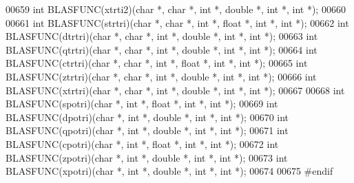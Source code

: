 \begin{DoxyCode}
00659 \textcolor{keywordtype}{int} BLASFUNC(xtrti2)(\textcolor{keywordtype}{char} *, \textcolor{keywordtype}{char} *, \textcolor{keywordtype}{int} *, \textcolor{keywordtype}{double} *, \textcolor{keywordtype}{int} *, \textcolor{keywordtype}{int} *);
00660 
00661 \textcolor{keywordtype}{int} BLASFUNC(strtri)(\textcolor{keywordtype}{char} *, \textcolor{keywordtype}{char} *, \textcolor{keywordtype}{int} *, \textcolor{keywordtype}{float}  *, \textcolor{keywordtype}{int} *, \textcolor{keywordtype}{int} *);
00662 \textcolor{keywordtype}{int} BLASFUNC(dtrtri)(\textcolor{keywordtype}{char} *, \textcolor{keywordtype}{char} *, \textcolor{keywordtype}{int} *, \textcolor{keywordtype}{double} *, \textcolor{keywordtype}{int} *, \textcolor{keywordtype}{int} *);
00663 \textcolor{keywordtype}{int} BLASFUNC(qtrtri)(\textcolor{keywordtype}{char} *, \textcolor{keywordtype}{char} *, \textcolor{keywordtype}{int} *, \textcolor{keywordtype}{double} *, \textcolor{keywordtype}{int} *, \textcolor{keywordtype}{int} *);
00664 \textcolor{keywordtype}{int} BLASFUNC(ctrtri)(\textcolor{keywordtype}{char} *, \textcolor{keywordtype}{char} *, \textcolor{keywordtype}{int} *, \textcolor{keywordtype}{float}  *, \textcolor{keywordtype}{int} *, \textcolor{keywordtype}{int} *);
00665 \textcolor{keywordtype}{int} BLASFUNC(ztrtri)(\textcolor{keywordtype}{char} *, \textcolor{keywordtype}{char} *, \textcolor{keywordtype}{int} *, \textcolor{keywordtype}{double} *, \textcolor{keywordtype}{int} *, \textcolor{keywordtype}{int} *);
00666 \textcolor{keywordtype}{int} BLASFUNC(xtrtri)(\textcolor{keywordtype}{char} *, \textcolor{keywordtype}{char} *, \textcolor{keywordtype}{int} *, \textcolor{keywordtype}{double} *, \textcolor{keywordtype}{int} *, \textcolor{keywordtype}{int} *);
00667 
00668 \textcolor{keywordtype}{int} BLASFUNC(spotri)(\textcolor{keywordtype}{char} *, \textcolor{keywordtype}{int} *, \textcolor{keywordtype}{float}  *, \textcolor{keywordtype}{int} *, \textcolor{keywordtype}{int} *);
00669 \textcolor{keywordtype}{int} BLASFUNC(dpotri)(\textcolor{keywordtype}{char} *, \textcolor{keywordtype}{int} *, \textcolor{keywordtype}{double} *, \textcolor{keywordtype}{int} *, \textcolor{keywordtype}{int} *);
00670 \textcolor{keywordtype}{int} BLASFUNC(qpotri)(\textcolor{keywordtype}{char} *, \textcolor{keywordtype}{int} *, \textcolor{keywordtype}{double} *, \textcolor{keywordtype}{int} *, \textcolor{keywordtype}{int} *);
00671 \textcolor{keywordtype}{int} BLASFUNC(cpotri)(\textcolor{keywordtype}{char} *, \textcolor{keywordtype}{int} *, \textcolor{keywordtype}{float}  *, \textcolor{keywordtype}{int} *, \textcolor{keywordtype}{int} *);
00672 \textcolor{keywordtype}{int} BLASFUNC(zpotri)(\textcolor{keywordtype}{char} *, \textcolor{keywordtype}{int} *, \textcolor{keywordtype}{double} *, \textcolor{keywordtype}{int} *, \textcolor{keywordtype}{int} *);
00673 \textcolor{keywordtype}{int} BLASFUNC(xpotri)(\textcolor{keywordtype}{char} *, \textcolor{keywordtype}{int} *, \textcolor{keywordtype}{double} *, \textcolor{keywordtype}{int} *, \textcolor{keywordtype}{int} *);
00674 
00675 \textcolor{preprocessor}{#endif}
\end{DoxyCode}
